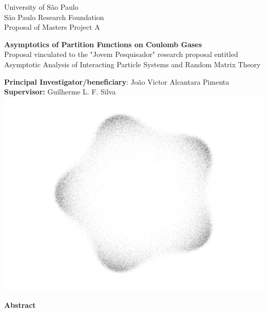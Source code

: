 \documentclass[12pt,a4paper]{article}
\numberwithin{equation}{section} %
\begin{document}
\begin{titlepage}
    \begin{center}
        {\large \sc University of São Paulo} \\
		{\large \sc São Paulo Research Foundation}\\
    	{\large \sc Proposal of Masters Project A}
    	
    	\vspace{1cm}
    	
    	{\Large \bfseries Asymptotics of Partition Functions on Coulomb Gases} \\
    	\vspace{1cm}
    	{\small \sc Proposal vinculated to the "Jovem Pesquisador" research proposal entitled} \\
    	{\small \sc Asymptotic Analysis of Interacting Particle Systems and Random Matrix Theory} \\
    	\vspace{1cm}
    	
    	{\small \sc \textbf{Principal Investigator/beneficiary}: João Victor Alcantara Pimenta}\\
    	{\small \sc \textbf{Supervisor:} Guilherme L. F. Silva}\\[0.5cm]
    	
    	\includegraphics[scale=0.35]{Assets/CuteCircleWhite}
    	
    \end{center}

    \vfill

    \begin{center}
        {\bf \large Abstract} \\[1em]
    \end{center}
    
    
\end{titlepage}
\end{document}
